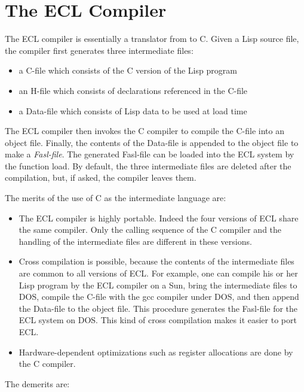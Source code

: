 \section{The ECL Compiler}
 
The ECL compiler is essentially a translator from \clisp{} to C.  Given
a Lisp source file, the compiler first generates three intermediate
files:

\begin{itemize}
\item a C-file which consists of the C version of the Lisp program
\item an H-file which consists of declarations referenced in the C-file
\item a Data-file which consists of Lisp data to be used at load time
\end{itemize}

The ECL compiler then invokes the C compiler to compile the
C-file into an object file.  Finally, the contents of the Data-file is
appended to the object file to make a {\em Fasl-file}.  The generated
Fasl-file can be loaded into the ECL system by the \clisp
function {\code load}.  By default, the three intermediate files are
deleted after the compilation, but, if asked, the compiler leaves
them.

The merits of the use of C as the intermediate language are:

\begin{itemize}
\item  The ECL compiler is highly portable.  Indeed the four versions
of ECL share the same compiler.  Only the calling sequence
of the C compiler and the handling of the intermediate files are different
in these versions. 

\item Cross compilation is possible, because the contents of the
intermediate files are common to all versions of ECL.  For example,
one can compile his or her Lisp program by the ECL compiler on
a Sun, bring the intermediate files to DOS, compile the C-file with
the gcc compiler under DOS, and then append the Data-file to the object
file.  This procedure generates the Fasl-file for the ECL system on
DOS.  This kind of cross compilation makes it easier to port ECL.

\item Hardware-dependent optimizations such as register allocations
are done by the C compiler.
\end{itemize}

The demerits are:

